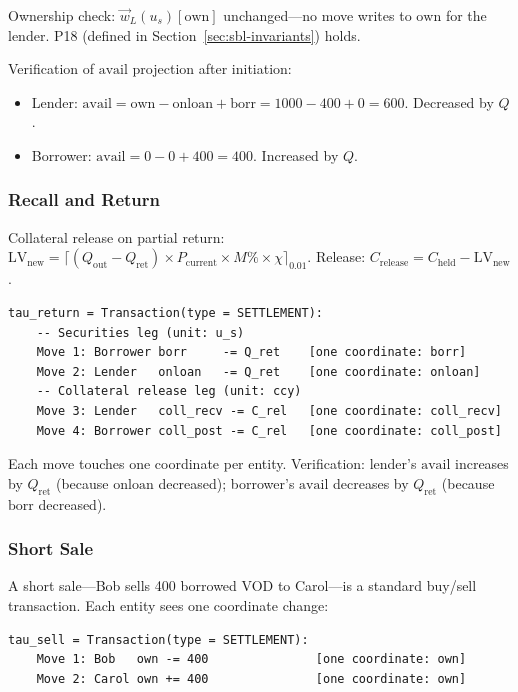 \documentclass[11pt,a4paper]{article}
\begin{document}
\noindent Ownership check: $\vec{w}_L(u_s)[\mathrm{own}]$ unchanged---no move writes to $\mathrm{own}$ for the lender. P18 (defined in Section~\ref{sec:sbl-invariants}) holds.

\noindent Verification of $\mathrm{avail}$ projection after initiation:
\begin{itemize}[nosep]
\item Lender: $\mathrm{avail} = \mathrm{own} - \mathrm{onloan} + \mathrm{borr} = 1000 - 400 + 0 = 600$. Decreased by $Q$. \checkmark
\item Borrower: $\mathrm{avail} = 0 - 0 + 400 = 400$. Increased by $Q$. \checkmark
\end{itemize}

\subsubsection{Recall and Return}

Collateral release on partial return: $\mathrm{LV}_{\mathrm{new}} = \lceil (Q_{\mathrm{out}} - Q_{\mathrm{ret}}) \times P_{\mathrm{current}} \times M\% \times \chi \rceil_{0.01}$. Release: $C_{\mathrm{release}} = C_{\mathrm{held}} - \mathrm{LV}_{\mathrm{new}}$.

\begin{lstlisting}
tau_return = Transaction(type = SETTLEMENT):
    -- Securities leg (unit: u_s)
    Move 1: Borrower borr     -= Q_ret    [one coordinate: borr]
    Move 2: Lender   onloan   -= Q_ret    [one coordinate: onloan]
    -- Collateral release leg (unit: ccy)
    Move 3: Lender   coll_recv -= C_rel   [one coordinate: coll_recv]
    Move 4: Borrower coll_post -= C_rel   [one coordinate: coll_post]
\end{lstlisting}

\noindent Each move touches one coordinate per entity. Verification: lender's $\mathrm{avail}$ increases by $Q_{\mathrm{ret}}$ (because $\mathrm{onloan}$ decreased); borrower's $\mathrm{avail}$ decreases by $Q_{\mathrm{ret}}$ (because $\mathrm{borr}$ decreased). \checkmark

\subsubsection{Short Sale}

A short sale---Bob sells 400 borrowed VOD to Carol---is a standard buy/sell transaction. Each entity sees one coordinate change:

\begin{lstlisting}
tau_sell = Transaction(type = SETTLEMENT):
    Move 1: Bob   own -= 400               [one coordinate: own]
    Move 2: Carol own += 400               [one coordinate: own]
\end{lstlisting}
\end{document}
